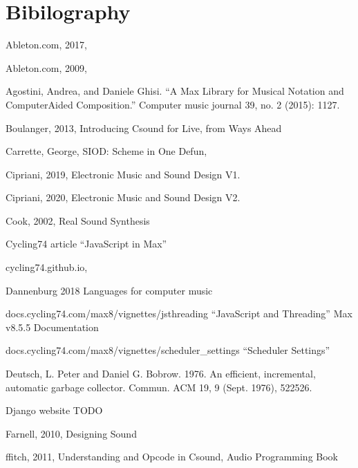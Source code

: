 \documentclass[letterpaper,10pt,english]{sphinxmanual}
\begin{document}
\sphinxstepscope


\chapter{Bibilography}
\label{\detokenize{bibliography:bibilography}}\label{\detokenize{bibliography::doc}}
\sphinxAtStartPar
Ableton.com, 2017, 

\sphinxAtStartPar
Ableton.com, 2009, 

\sphinxAtStartPar
Agostini, Andrea, and Daniele Ghisi. “A Max Library for Musical Notation and Computer\sphinxhyphen{}Aided Composition.” Computer music journal 39, no. 2 (2015): 11\textendash{}27.

\sphinxAtStartPar
Boulanger, 2013, Introducing Csound for Live, from Ways Ahead

\sphinxAtStartPar
Carrette, George, SIOD: Scheme in One Defun, 

\sphinxAtStartPar
Cipriani, 2019, Electronic Music and Sound Design V1.

\sphinxAtStartPar
Cipriani, 2020, Electronic Music and Sound Design V2.

\sphinxAtStartPar
Cook, 2002, Real Sound Synthesis

\sphinxAtStartPar
Cycling74 article “JavaScript in Max”

\sphinxAtStartPar
cycling74.github.io, 

\sphinxAtStartPar
Dannenburg 2018 \sphinxhyphen{} Languages for computer music

\sphinxAtStartPar
docs.cycling74.com/max8/vignettes/jsthreading “JavaScript and Threading” Max v8.5.5 Documentation

\sphinxAtStartPar
docs.cycling74.com/max8/vignettes/scheduler\_settings “Scheduler Settings”

\sphinxAtStartPar
Deutsch, L. Peter and Daniel G. Bobrow. 1976. An efficient, incremental, automatic garbage collector. Commun. ACM 19, 9 (Sept. 1976), 522\textendash{}526. 

\sphinxAtStartPar
Django website TODO

\sphinxAtStartPar
Farnell, 2010, Designing Sound

\sphinxAtStartPar
ffitch, 2011, Understanding and Opcode in Csound, Audio Programming Book
\end{document}
